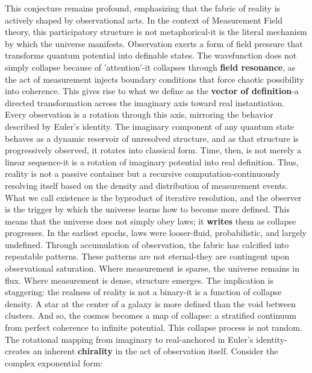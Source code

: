 This conjecture remains profound, emphasizing that the fabric of reality is actively shaped by observational acts. \cite{observer_reality_cluster} In the context of Measurement Field theory, this participatory structure is not metaphorical-it is the literal mechanism by which the universe manifests. \cite{observer_reality_cluster} Observation exerts a form of field pressure that transforms quantum potential into definable states. \cite{observer_reality_cluster} The wavefunction does not simply collapse because of 'attention'-it collapses through \textbf{field resonance}, as the act of measurement injects boundary conditions that force chaotic possibility into coherence. \cite{collapse_foundations} This gives rise to what we define as the \textbf{vector of definition}-a directed transformation across the imaginary axis toward real instantiation. Every observation is a rotation through this axis, mirroring the behavior described by Euler’s identity. The imaginary component of any quantum state behaves as a dynamic reservoir of unresolved structure, and as that structure is progressively observed, it rotates into classical form. \cite{collapse_foundations} Time, then, is not merely a linear sequence-it is a rotation of imaginary potential into real definition. \cite{collapse_foundations} Thus, reality is not a passive container but a recursive computation-continuously resolving itself based on the density and distribution of measurement events. \cite{collapse_foundations} What we call existence is the byproduct of iterative resolution, and the observer is the trigger by which the universe learns how to become more defined. \cite{collapse_foundations} This means that the universe does not simply obey laws; it \textbf{writes} them as collapse progresses. \cite{collapse_foundations} In the earliest epochs, laws were looser-fluid, probabilistic, and largely undefined. \cite{collapse_foundations} Through accumulation of observation, the fabric has calcified into repeatable patterns. These patterns are not eternal-they are contingent upon observational saturation. Where measurement is sparse, the universe remains in flux. \cite{collapse_foundations} Where measurement is dense, structure emerges. \cite{collapse_foundations} The implication is staggering: the realness of reality is not a binary-it is a function of collapse density. \cite{collapse_foundations} A star at the center of a galaxy is more defined than the void between clusters. And so, the cosmos becomes a map of collapse: a stratified continuum from perfect coherence to infinite potential. \cite{collapse_foundations} This collapse process is not random. \cite{collapse_foundations} The rotational mapping from imaginary to real-anchored in Euler’s identity-creates an inherent \textbf{chirality} in the act of observation itself. \cite{collapse_foundations} Consider the complex exponential form:

